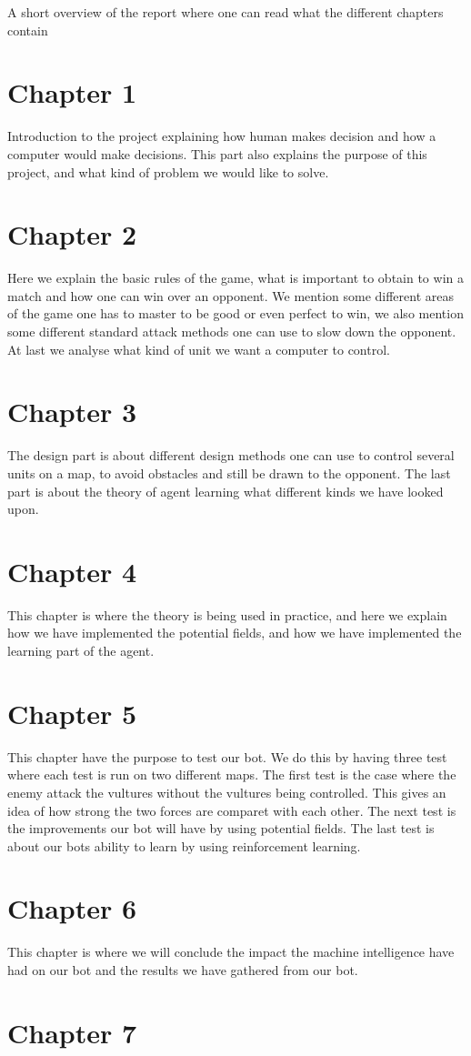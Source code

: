A short overview of the report where one can read what the different chapters contain

\section*{Chapter 1}
Introduction to the project explaining how human makes decision and how a computer would make decisions. This part also explains the purpose of this project, and what kind of problem we would like to solve.
\section*{Chapter 2}
Here we explain the basic rules of the game, what is important to obtain to win a match and how one can win over an opponent. We mention some different areas of the game one has to master to be good or even perfect to win, we also mention some different standard attack methods one can use to slow down the opponent. At last we analyse what kind of unit we want a computer to control.
\section*{Chapter 3}
The design part is about different design methods one can use to control several units on a map, to avoid obstacles and still be drawn to the opponent. The last part is about the theory of agent learning what different kinds we have looked upon.
\section*{Chapter 4}
This chapter is where the theory is being used in practice, and here we explain how we have implemented the potential fields, and how we have implemented the learning part of the agent.
\section*{Chapter 5}
This chapter have the purpose to test our bot. We do this by having three test where each test is run on two different maps. The first test is the case
where the enemy attack the vultures without the vultures being controlled. This gives an idea of how strong the two forces are comparet with each other. The next test is the improvements our bot will have by using potential fields. The last test is about our bots ability to learn by using reinforcement learning.
\section*{Chapter 6}
This chapter is where we will conclude the impact the machine intelligence have had on our bot and the results we have gathered from our bot.
\section*{Chapter 7}